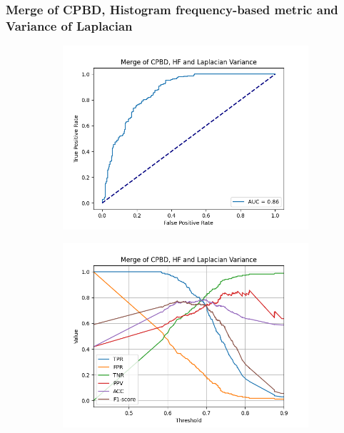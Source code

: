 \subsubsection{Merge of CPBD, Histogram frequency-based metric and Variance of Laplacian}
\begin{figure}[H]
    \centering
    \begin{subfigure}[t]{0.48\textwidth}
        \includegraphics[width=\textwidth]{Figures/BlurredImages/results_on_thresholds/output_roc_cpbd_hf_lv.png}
        \caption{}
        \label{fig:CPBD_HF_LV_roc}
    \end{subfigure}\hspace{1em}
    \begin{subfigure}[t]{0.48\textwidth}
        \includegraphics[width=\textwidth]{Figures/BlurredImages/results_on_thresholds/threshold_test_scores_cpbd_hf_lv.png}

\end{subfigure}
\end{figure}
